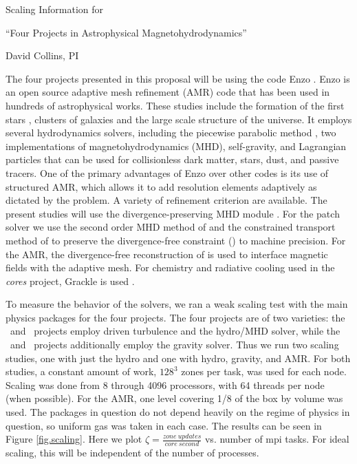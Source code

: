 \documentclass[11pt]{NSF}  %
\begin{document}
\begin{centering}
\begin{LARGE}
Scaling Information for 

``Four Projects in Astrophysical Magnetohydrodynamics''
\end{LARGE}

David Collins, PI

\end{centering}


\pagestyle{plain}

The four projects presented in this proposal will be using the code Enzo
\citep{Collins10, Bryan14}.
Enzo  is an open source adaptive mesh refinement (AMR) code that
has been used in hundreds of astrophysical works.  These studies include the
formation of the first stars \citep{Abel02}, clusters of galaxies \citep{Xu11}
and the large scale structure of the universe.  It employs several hydrodynamics
solvers, including the piecewise parabolic method  \citep[PPM,][]{Colella84}, two implementations of
magnetohydrodynamics (MHD), self-gravity, and Lagrangian particles that can be used
for collisionless dark matter, stars, dust, and passive tracers.  One of the
primary advantages of Enzo over other codes is its use of structured AMR, which
allows it to add resolution elements adaptively as dictated by the problem.  A
variety of refinement criterion are available.   The present studies will use
the divergence-preserving MHD module \citep{Collins10}.  For the patch solver we
use the
second order MHD method of \citet{Li08a} and the constrained transport method of
\citet{Gardiner05} to preserve the divergence-free constraint (\divbo) to
machine precision.  For the AMR, the divergence-free reconstruction of \citet{Balsara01}
is used to interface magnetic fields with the adaptive mesh.  For chemistry and
radiative cooling used in the \emph{cores} project, Grackle is used
\citep{Smith17}.  

To measure the behavior of the solvers, we ran a weak scaling test with the main
physics packages for the four projects.  The four projects are of two varieties:
the \nameCMB\ and \nameTurbulence\ projects employ driven turbulence and the
hydro/MHD solver, while the \nameCores\ and \nameGalaxies\ projects additionally
employ the gravity solver.  Thus we run two scaling studies, one with just the
hydro and one with hydro, gravity, and AMR.  For both studies,
a constant amount of
work, $128^3$ zones per task, was used for each node. 
Scaling was done from 8 through 4096
processors, with 64 threads per node (when possible).
For the AMR, one level covering 1/8 of the box by volume was used.
The packages in question do not depend heavily on the regime of
physics in question, so uniform gas was taken in each case.  The results can be
seen in Figure \ref{fig.scaling}.  Here we plot $\zeta = \frac{zone\
updates}{core\ second}$ vs. number of mpi tasks.
For ideal scaling, this will be independent of the number of processes.
\end{document}
